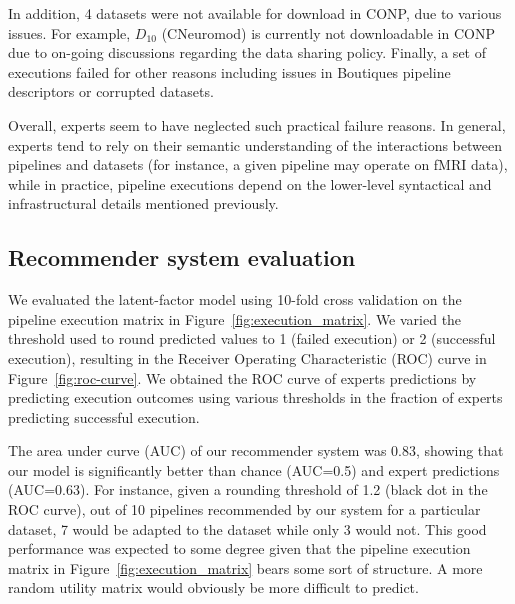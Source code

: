 In addition, 4 datasets were not available for download in CONP, due to
various issues. For example, $D_{10}$ (CNeuromod) is currently not
downloadable in CONP due to on-going discussions regarding the data sharing policy.
Finally, a set of executions failed for other reasons including issues in
Boutiques pipeline descriptors or corrupted datasets.


Overall, experts seem to have neglected such practical failure reasons. In
general, experts tend to rely on their semantic understanding of the
interactions between pipelines and datasets (for instance, a given pipeline
may operate on fMRI data), while in practice, pipeline executions depend on
the lower-level syntactical and infrastructural details mentioned previously.




\subsection{Recommender system evaluation} 

We evaluated the latent-factor model using 10-fold cross validation on the
pipeline execution matrix in Figure~\ref{fig:execution_matrix}. We varied
the threshold used to round predicted values to 1 (failed execution) or 2
(successful execution), resulting in the Receiver Operating Characteristic
(ROC) curve  in Figure~\ref{fig:roc-curve}. We obtained the ROC curve of
experts predictions by predicting execution outcomes using various
thresholds in the fraction of experts predicting successful execution. 

The area under curve (AUC) of our recommender system was 0.83, showing that
our model is significantly better than chance (AUC=0.5) and expert
predictions (AUC=0.63). For instance, given a rounding threshold of 1.2
(black dot in the ROC curve), out of 10 pipelines
recommended by our system for a particular dataset, 7 would be adapted to
the dataset while only 3 would not. This good performance was expected to some degree given that the pipeline execution matrix in
Figure~\ref{fig:execution_matrix} bears some sort of structure. 
A more random utility matrix would obviously be more difficult to predict.


